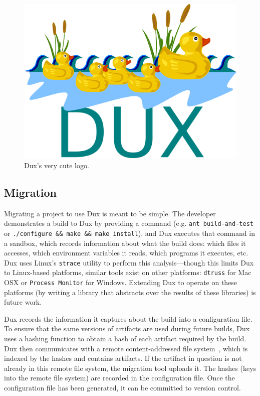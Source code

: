 \documentclass[10pt,conference]{IEEEtran}
\begin{document}
\begin{figure}
\includegraphics[width=\columnwidth]{DUX}
\caption{Dux's very cute logo.}
\end{figure}

\subsection{Migration}

Migrating a project to use Dux is meant to be simple.
The developer demonstrates a build to Dux by providing a command (e.g. \texttt{ant build-and-test}
or \texttt{./configure \&\& make \&\& make install}),
and Dux executes that command in a sandbox, which records information about what the build does:
which files it accesses, which environment variables it reads, which programs it executes, etc.
Dux uses Linux's \texttt{strace} utility to perform this analysis---though this limits Dux to
Linux-based platforms, similar tools exist on other platforms: \texttt{dtruss} for Mac OSX or
\texttt{Process Monitor} for Windows. Extending Dux to operate on these platforms (by writing a
library that abstracts over the results of these libraries) is future work.

Dux records the information it captures about the build into a configuration file.
To ensure that the same versions of artifacts are used during future builds,
Dux uses a hashing function to obtain a hash of each artifact required by the build.
Dux then communicates with a remote content-addressed file system~\cite{venti},
which is indexed by the hashes and contains artifacts.
If the artifact in question is not already in this remote file system, the migration tool uploads it.
The hashes (keys into the remote file system) are recorded in the configuration file.
Once the configuration file has been generated, it can be committed to version control.
\end{document}
